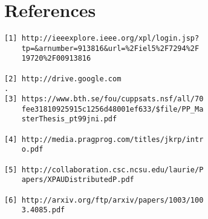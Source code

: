 \documentclass[journal,a4paper]{IEEEtran}
\begin{document}
\section{References}
\begin{lstlisting}
[1] http://ieeexplore.ieee.org/xpl/login.jsp?
    tp=&arnumber=913816&url=%2Fiel5%2F7294%2F
    19720%2F00913816 

[2] http://drive.google.com
. 
[3] https://www.bth.se/fou/cuppsats.nsf/all/70
    fee31810925915c1256d48001ef633/$file/PP_Ma
    sterThesis_pt99jni.pdf

[4] http://media.pragprog.com/titles/jkrp/intr
    o.pdf

[5] http://collaboration.csc.ncsu.edu/laurie/P
    apers/XPAUDistributedP.pdf

[6] http://arxiv.org/ftp/arxiv/papers/1003/100
    3.4085.pdf
\end{lstlisting}


\end{document}
